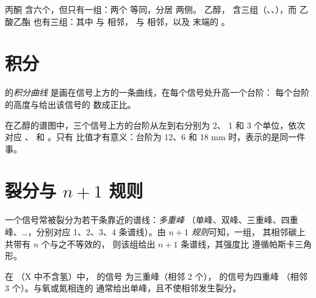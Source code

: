 \begin{example}[计数基团]\label{ex:g12:proton-nmr:groups}
丙酮  含六个，但只有一组：两个
 等同，分居  两侧。
乙醇， 含三组（、、），而
乙酸乙酯  也有三组：其中 
与  相邻， 与  相邻，以及
末端的 。
\end{example}

\section{积分}

\begin{definition}[积分曲线]\label{def:g12:proton-nmr:integration}
的\emph{积分曲线}
是画在信号上方的一条曲线，在每个信号处升高一个台阶：
每个台阶的高度与给出该信号的
数成正比。
\end{definition}

\begin{example}[读取台阶]\label{ex:g12:proton-nmr:steps}
在乙醇的谱图中，三个信号上方的台阶从左到右分别为 2、
1 和 3 个单位，依次对应 、 和 。只有
比值才有意义：台阶为 12、6 和 18 mm 时，表示的是同一件事。
\end{example}

\section{裂分与 \texorpdfstring{$n+1$}{n+1} 规则}


\begin{definition}[多重峰、$n+1$ 规则]\label{def:g12:proton-nmr:multiplet}
一个信号常被裂分为若干条靠近的谱线：\emph{多重峰}
（单峰、双峰、三重峰、四重峰、\dots{}，分别对应 1、2、3、4 条谱线）。由
\emph{$n+1$ 规则}可知，一组，
其相邻碳上共带有 $n$ 个与之不等效的，
则该组给出 $n+1$ 条谱线，其强度比
遵循帕斯卡三角形。
\end{definition}

\begin{proposition}[相邻质子引起的裂分]\label{prop:g12:proton-nmr:n-plus-one}
在 （X 中不含氢）中， 的信号
为三重峰（相邻 2 个）， 的信号为四重峰
（相邻 3 个）。与氧或氮相连的
通常给出单峰，且不使相邻发生裂分。
\end{proposition}

